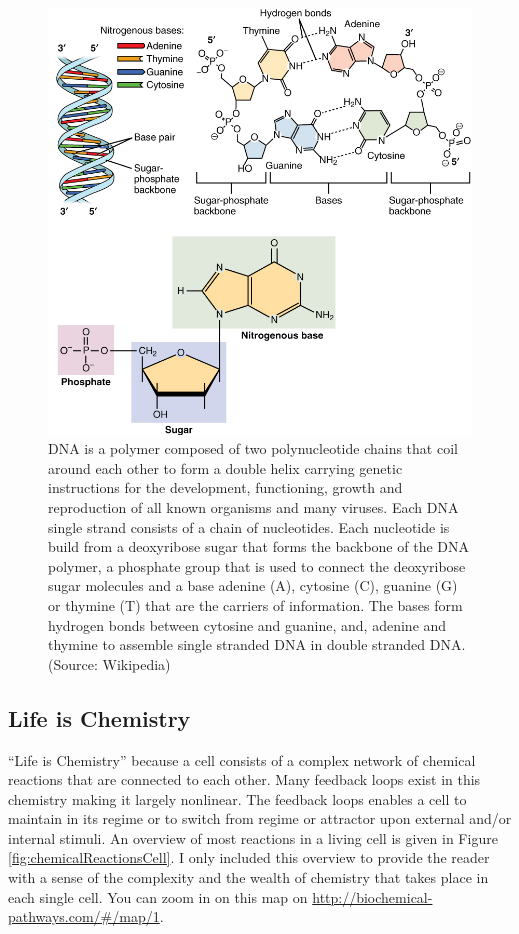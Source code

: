 \documentclass[
  11pt,
]{book}
\begin{document}
\begin{figure}

{\centering \includegraphics[width=0.5\linewidth]{./figs/DNA_Nucleotides} 

}

\caption{DNA is a polymer composed of two polynucleotide chains that coil around each other to form a double helix carrying genetic instructions for the development, functioning, growth and reproduction of all known organisms and many viruses. Each DNA single strand consists of a chain of nucleotides. Each nucleotide is build from a deoxyribose sugar that forms the backbone of the DNA  polymer, a phosphate group that is used to connect the deoxyribose sugar molecules and a base adenine (A), cytosine (C), guanine (G) or thymine (T) that are the carriers of information. The bases form hydrogen bonds between cytosine and guanine, and, adenine and thymine to assemble single stranded DNA in double stranded DNA. (Source: Wikipedia)}\label{fig:DNA}
\end{figure}

\newpage

\hypertarget{lifeChemistry}{%
\subsection{Life is Chemistry}\label{lifeChemistry}}

``Life is Chemistry'' because a cell consists of a complex network of chemical reactions that are connected to each other. Many feedback loops exist in this chemistry making it largely nonlinear. The feedback loops enables a cell to maintain in its regime or to switch from regime or attractor upon external and/or internal stimuli. An overview of most reactions in a living cell is given in Figure \ref{fig:chemicalReactionsCell}. I only included this overview to provide the reader with a sense of the complexity and the wealth of chemistry that takes place in each single cell. You can zoom in on this map on \url{http://biochemical-pathways.com/\#/map/1}.
\end{document}
